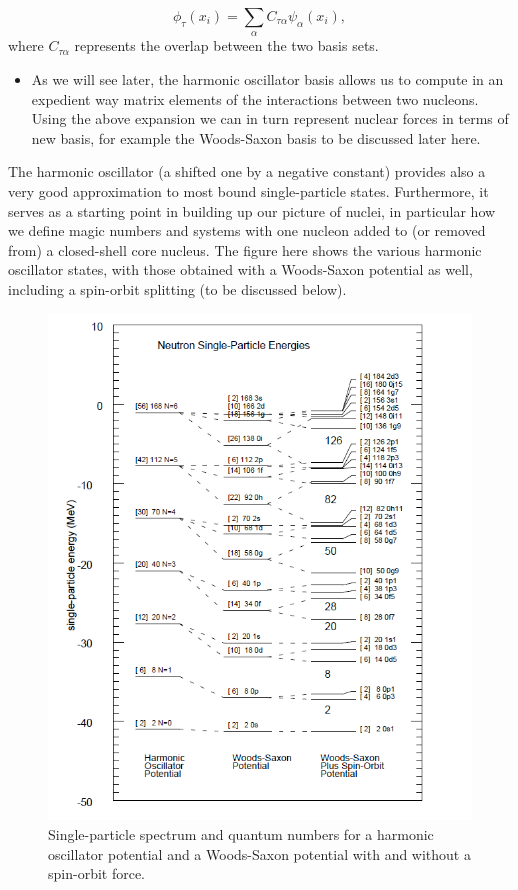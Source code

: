\documentclass[%
twoside,                 %
final,                   %
10pt]{article}
\begin{document}
\noindent
\[
\phi_{\tau}(x_i)=\sum_{\alpha} C_{\tau\alpha}\psi_{\alpha}(x_i),
\]
where $C_{\tau\alpha}$ represents the overlap between the two basis sets. 
\begin{itemize}
 \item As we will see later, the harmonic oscillator basis allows us to compute in an expedient way matrix elements of the interactions between two nucleons.  Using the above expansion we can in turn represent nuclear forces in terms of new basis, for example the  Woods-Saxon basis  to be discussed later here.
\end{itemize}

\noindent
The harmonic oscillator (a shifted one by a negative constant) provides also a very good approximation to most bound single-particle states. Furthermore, it serves as a starting point in building up our picture of nuclei, in particular how we define magic numbers and systems with one nucleon added to (or removed from) a closed-shell core nucleus. The figure here shows 
the various harmonic oscillator states, with those obtained with a Woods-Saxon potential as well, including a spin-orbit splitting (to be discussed below).

\begin{figure}[t]
  \centerline{\includegraphics[width=0.6\linewidth]{fig-intro/singleparticle.png}}
  \caption{
  Single-particle spectrum and quantum numbers for a harmonic oscillator potential and a Woods-Saxon potential with and without a spin-orbit force.
  }
\end{figure}
\end{document}
